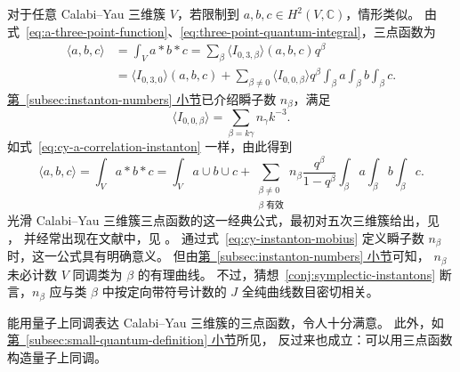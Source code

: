 \begin{example}
对于任意 Calabi--Yau 三维簇 $V$，若限制到 $a,b,c\in H^2(V,\mathbb C)$，情形类似。
由式~\eqref{eq:a-three-point-function}、\eqref{eq:three-point-quantum-integral}，三点函数为
\begin{equation}\label{eq:cy-quantum-correlation-gw}
\begin{aligned}
\langle a,b,c\rangle&=\int_Va*b*c=\sum_\beta\langle I_{0,3,\beta}\rangle(a,b,c)q^\beta\\
&=\langle I_{0,3,0}\rangle(a,b,c)+\sum_{\beta\ne0}\langle I_{0,0,\beta}\rangle q^\beta
\int_\beta a\int_\beta b\int_\beta c.
\end{aligned}
\end{equation}
\hyperref[subsec:instanton-numbers]{第~\ref*{subsec:instanton-numbers} 小节}已介绍瞬子数 $n_\beta$，满足
\begin{equation}\label{eq:cy-instanton-mobius}
\langle I_{0,0,\beta}\rangle=\sum_{\beta=k\gamma}n_\gamma k^{-3}.
\end{equation}
如式~\eqref{eq:cy-a-correlation-instanton} 一样，由此得到
\begin{equation}\label{eq:cy-quantum-correlation-instanton}
\langle a,b,c\rangle=\int_Va*b*c=\int_Va\cup b\cup c
+\sum_{\substack{\beta\ne0\\\beta\text{ 有效}}}n_\beta\frac{q^\beta}{1-q^\beta}\int_\beta a\int_\beta b\int_\beta c.
\end{equation}
光滑 Calabi--Yau 三维簇三点函数的这一经典公式，最初对五次三维簇给出，见 ，
并经常出现在文献中，见 。
通过式~\eqref{eq:cy-instanton-mobius} 定义瞬子数 $n_\beta$ 时，这一公式具有明确意义。
但由\hyperref[subsec:instanton-numbers]{第~\ref*{subsec:instanton-numbers} 小节}可知，
$n_\beta$ 未必计数 $V$ 同调类为 $\beta$ 的有理曲线。
不过，猜想~\ref{conj:symplectic-instantons} 断言，$n_\beta$ 应与类 $\beta$ 中按定向带符号计数的 $J$ 全纯曲线数目密切相关。

能用量子上同调表达 Calabi--Yau 三维簇的三点函数，令人十分满意。
此外，如\hyperref[subsec:small-quantum-definition]{第~\ref*{subsec:small-quantum-definition} 小节}所见，
反过来也成立：可以用三点函数构造量子上同调。
\end{example}

